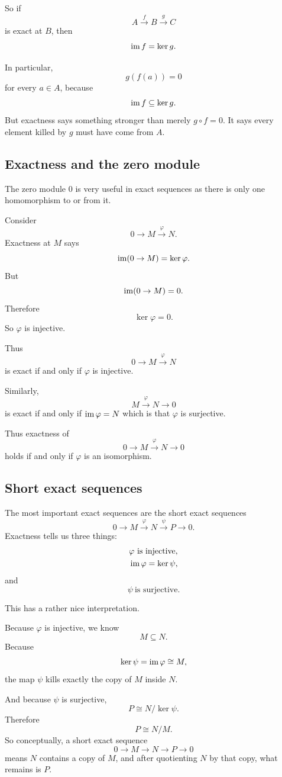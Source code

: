 \documentclass[11pt]{article}
\begin{document}
So if 
\[
    A \overset{f}{\to} B \overset{g}{\to} C
\]
is exact at $B$, then 
\[
    \operatorname{im} f = \ker g. 
\]

In particular, 
\[
    g(f(a)) = 0
\]
for every $a \in A$, because 
\[
    \operatorname{im} f \subseteq \ker g. 
\]
But exactness says something stronger than 
merely $g \circ f = 0$. It says every element killed 
by $g$ must have come from $A$. 

\subsection{Exactness and the zero module}

The zero module $0$ is very useful in exact sequences 
as there is only one homomorphism to or from it. 

Consider 
\[
    0 \to M \overset{\varphi}{\to} N. 
\]
Exactness at $M$ says 
\[
    \operatorname{im}(0 \to M) = \ker \varphi. 
\]
But 
\[
    \operatorname{im}(0 \to M) = 0. 
\]
Therefore 
\[
    \ker \varphi = 0. 
\]
So $\varphi$ is injective. 

Thus 
\[
    0 \to M \overset{\varphi}{\to} N 
\]
is exact if and only if 
$\varphi$ is injective. 

Similarly, 
\[
    M \overset{\varphi}{\to} N \to 0
\]
is exact if and only if $\operatorname{im} \varphi = N$ 
which is that $\varphi$ is surjective. 

Thus exactness of  
\[
    0 \to M \overset{\varphi}{\to} N \to 0
\]
holds if and only if $\varphi$ is an isomorphism. 

\subsection{Short exact sequences}

The most important exact sequences are the 
short exact sequences 
\[
    0 \to M \overset{\varphi}{\to} N 
    \overset{\psi}{\to} P \to 0. 
\]
Exactness tells us three things: 
\begin{align*}
    \varphi \ \text{is injective}, \\ 
    \operatorname{im} \varphi = \ker \psi, 
\end{align*}
and 
\[
    \psi \ \text{is surjective}. 
\]

This has a rather nice interpretation. 

Because $\varphi$ is injective, we know 
\[
    M \subseteq N. 
\]
Because 
\[
    \ker \psi = \operatorname{im} \varphi \cong M, 
\]
the map $\psi$ kills exactly the copy of $M$ inside 
$N$. 

And because $\psi$ is surjective, 
\[
    P \cong N / \ker \psi. 
\]
Therefore 
\[
    P \cong N/M. 
\]
So conceptually, a short exact sequence 
\[
    0 \to M \to N \to P \to 0
\]
means $N$ contains a copy of $M$, and after 
quotienting $N$ by that copy, what remains is $P$. 
\end{document}
